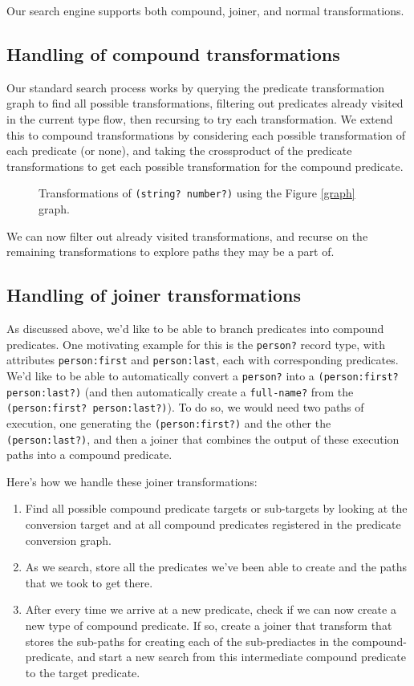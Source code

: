 \documentclass[letterpaper]{article}
\begin{document}
Our search engine supports both compound, joiner, and normal transformations.

\subsection{Handling of compound transformations}

Our standard search process works by querying the predicate transformation graph to find all possible transformations, filtering out predicates already visited in the current type flow, then recursing to try each transformation.  We extend this to compound transformations by considering each possible transformation of each predicate (or none), and taking the crossproduct of the predicate transformations to get each possible transformation for the compound predicate.

\begin{figure}[h!]
\centering

\caption{Transformations of \texttt{(string? number?)} using the Figure \ref{graph} graph.}
\label{crossproduct}
\end{figure}

We can now filter out already visited transformations, and recurse on the remaining transformations to explore paths they may be a part of.

\subsection{Handling of joiner transformations}

As discussed above, we'd like to be able to branch predicates into compound predicates.  One motivating example for this is the \texttt{person?} record type, with attributes \texttt{person:first} and \texttt{person:last}, each with corresponding predicates.  We'd like to be able to automatically convert a \texttt{person?} into a \texttt{(person:first? person:last?)} (and then automatically create a \texttt{full-name?} from the \texttt{(person:first? person:last?)}). To do so, we would need two paths of execution, one generating the \texttt{(person:first?)} and the other the \texttt{(person:last?)}, and then a joiner that combines the output of these execution paths into a compound predicate.

Here's how we handle these joiner transformations:
\begin{enumerate}
  \item Find all possible compound predicate targets or sub-targets by looking at the conversion target and at all compound predicates registered in the predicate conversion graph.
  \item As we search, store all the predicates we've been able to create and the paths that we took to get there.
  \item After every time we arrive at a new predicate, check if we can now create a new type of compound predicate. If so, create a joiner that transform that stores the sub-paths for creating each of the sub-prediactes in the compound-predicate, and start a new search from this intermediate compound predicate to the target predicate.
\end{enumerate}
\end{document}
